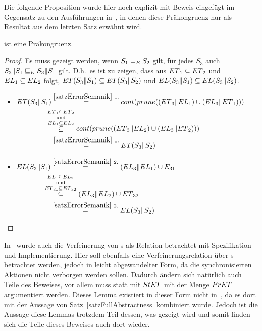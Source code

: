 Die folgende Proposition wurde hier noch explizit mit Beweis eingefügt im
Gegensatz zu den Ausführungen in~\cite{Vogler2014EIO}, in denen diese
Präkongruenz nur als Resultat aus dem letzten Satz erwähnt wird.

\begin{prop}[Präkongruenz]
  \label{korPraekongruenz}
  \ERel{} ist eine Präkongruenz.
\end{prop}

\begin{proof}
  Es muss gezeigt werden, wenn $S_1\sqsubseteq _E S_2$ gilt, für jedes
  $S_3$ auch
  $S_3\|S_1\sqsubseteq _E S_3\|S_1$ gilt. D.h.\ es ist zu zeigen, dass aus
  $ET{}_1\subseteq ET{}_2$ und $EL{}_1\subseteq EL{}_2$ folgt, $ET{}(S_3\|S_1)\subseteq
  ET{}(S_3\|S_2)$ und $EL{}(S_3\|S_1)\subseteq EL{}(S_3\|S_2)$.\\
  \begin{itemize}
    \item $\begin{aligned}[t]
        \ET{}(S_3\|S_1) &\overset{\ref{satzErrorSemanik}~1.}{=}
      \cont{}(\prune{}((\ET{}_3\|\EL{}_1)\cup (\EL{}_3\|\ET{}_1)))\\
      &\hspace{-0.3cm}\overset{\ET{}_1\subseteq
    \ET{}_2}{\overset{\mathrm{und}}{\overset{\EL{}_1\subseteq \EL{}_2}{\subseteq}}}
    \cont{}(\prune{}((\ET{}_3\|\EL{}_2)\cup (\EL{}_3\|\ET{}_2)))\\
      &\overset{\ref{satzErrorSemanik}~1.}{=} \ET{}(S_3\|S_2)
    \end{aligned}$
    \item $\begin{aligned}[t]
        \EL{}(S_3\|S_1) &\overset{\ref{satzErrorSemanik}~2.}{=} (\EL{}_3\|\EL{}_1)\cup
        E_{31}\\
        &\hspace{-0.4cm}\overset{\EL{}_1\subseteq
      \EL{}_2}{\overset{\mathrm{und}}{\overset{\ET{}_{31}\subseteq
      \ET{}_{32}}{\subseteq}}} (\EL{}_3\|\EL{}_2)\cup \ET{}_{32}\\
      &\overset{\ref{satzErrorSemanik}~2.}{=} \EL{}(S_3\|S_2)
    \end{aligned}$
  \end{itemize}
\end{proof}

In~\cite{Vogler2014EIO} wurde auch die Verfeinerung von \EIO{}s als Relation betrachtet
mit Spezifikation und Implementierung. Hier soll ebenfalls eine
Verfeinerungsrelation über \EIO{}s betrachtet werden, jedoch in leicht
abgewandelter Form, da die synchronisierten Aktionen nicht verborgen werden
sollen. Dadurch ändern sich natürlich auch Teile des Beweises, vor allem muss
statt mit $StET{}$ mit der Menge $PrET{}$ argumentiert werden. Dieses Lemma
existiert in dieser Form nicht in~\cite{Schlosser2012BA}, da es dort mit der
Aussage von Satz~\ref{satzFullAbstractness} kombiniert wurde. Jedoch ist die
Aussage diese Lemmas trotzdem Teil dessen, was gezeigt wird und somit finden
sich die Teile dieses Beweises auch dort wieder.

